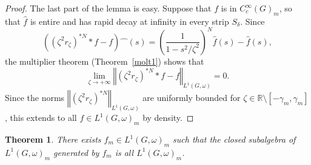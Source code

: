 \documentclass[12pt,a4paper]{amsart}
\newtheorem{thm}{Theorem}[section]
\theoremstyle{definition}
\theoremstyle{remark}
\numberwithin{equation}{section}
\newcommand{\norm}[1]{\left\Vert#1\right\Vert}
\newcommand{\lpar}{\left(}
\newcommand{\rpar}{\right)}
\newcommand{\afterhat}{\hat{\phantom{m}}}
\newcommand{\R}{\mathbb{R}}
\newcommand{\var}{s}
\begin{document}
\begin{proof}
The last part of the lemma is easy. 
Suppose that $f$ is in $C^\infty_c(G)_m$, so that $\hat f$ is entire and has rapid decay at infinity in every strip $S_\delta$.
Since
\[
\lpar (\zeta^2 r_\zeta)^{*N} * f - f \rpar\afterhat(\var) = 
\lpar \frac{1}{1 - \var^2/\zeta^2}\rpar^N \hat f(\var) - \hat f(\var) ,
\]
the multiplier theorem (Theorem~\ref{molt1}) shows that
\[
\lim_{\zeta \to +\infty}\norm{  (\zeta^2 r_\zeta)^{*N} * f - f }_{L^1(G,\omega)} =0 .
\]  
Since the norms $\norm { (\zeta^2r_\zeta)^{*N }}_{L^1(G,\omega)}$ are uniformly bounded   for $\zeta \in \R \setminus [-\gamma_m,\gamma_m]$, this extends to all $f \in L^1(G,\omega)_m$ by density. 
\end{proof}
  



\begin{thm}\label{thm:generator}
There exists $f_m \in L^1(G,\omega)_{m}$ such that the closed subalgebra of $L^1(G,\omega)_{m}$ generated by $f_m$ is all $L^1(G,\omega)_{m}$.
\end{thm}
\end{document}
